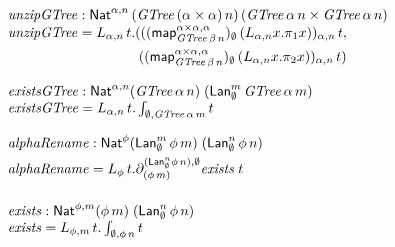 \documentclass[acmsmall,review,anonymous]{acmart}
\theoremstyle{definition}
\newcommand{\map}{\mathsf{map}}
\begin{document}
\[\begin{array}{l}
  \mathit{unzipGTree} : \Nat^{\alpha, n} \, (\mathit{GTree}\,(\alpha \times \alpha)\,n) \, (\mathit{GTree}\,\alpha\,n \times \mathit{GTree}\,\alpha\,n) \\
  \vspace{0.05in}
  \mathit{unzipGTree} = L_{\alpha, n}\, t. (     
    ((\map^{\alpha \times \alpha, \alpha}_{\mathit{GTree}\,\beta\,n})_\emptyset \, (L_{\alpha, n} x. \pi_1 x))_{\alpha, n} \, t ,\\
    \hspace{1.3in}       ((\map^{\alpha \times \alpha, \alpha}_{\mathit{GTree}\,\beta\,n})_\emptyset \, (L_{\alpha, n} x. \pi_2 x))_{\alpha, n} \, t)\\ \\
   


  \mathit{existsGTree} : \Nat^{\alpha, n} (\mathit{GTree}\,\alpha\,n) \; (\Lan^m_\emptyset \,\mathit{GTree}\,\alpha\,m) \\
    \vspace{0.15in}
    \mathit{existsGTree} = L_{\alpha, n} \, t. \int_{\emptyset,\mathit{GTree}\,\alpha\,m} t \\ 
    \vspace{0.05in}
  \mathit{alphaRename} : \Nat^{\phi} (\Lan^m_\emptyset \,\phi\,m) \; (\Lan^n_\emptyset \,\phi\,n)\\
    \vspace{0.05in}
    \mathit{alphaRename} = L_{\phi}\, t.  \partial^{(\Lan^n_\emptyset \phi\,n), \emptyset}_{(\phi\,m)} \mathit{exists}  \;t \\
    \\
    \mathit{exists} : \Nat^{\phi, m} (\phi\,m) \; (\Lan^n_\emptyset \, \phi \,n) \\
    \mathit{exists} = L_{\phi, m}\, t . \int_{\emptyset, \phi\,n} t \\ \\


\end{array}\]
\end{document}
